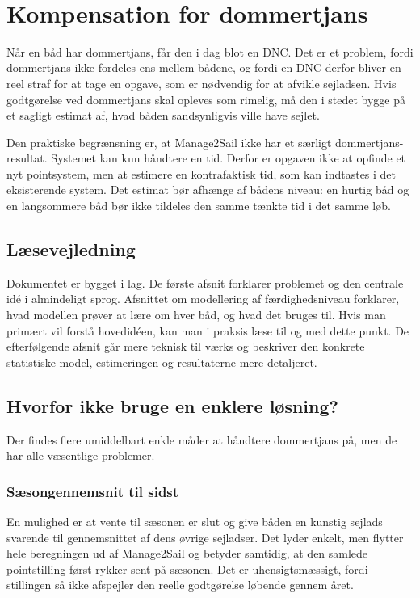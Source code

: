 \newpage
﻿\section{Kompensation for dommertjans}
Når en båd har dommertjans, får den i dag blot en DNC. Det er et problem, fordi dommertjans ikke fordeles ens mellem bådene, og fordi en DNC derfor bliver en reel straf for at tage en opgave, som er nødvendig for at afvikle sejladsen. Hvis godtgørelse ved dommertjans skal opleves som rimelig, må den i stedet bygge på et sagligt estimat af, hvad båden sandsynligvis ville have sejlet.

Den praktiske begrænsning er, at Manage2Sail ikke har et særligt dommertjans-resultat. Systemet kan kun håndtere en tid. Derfor er opgaven ikke at opfinde et nyt pointsystem, men at estimere en kontrafaktisk tid, som kan indtastes i det eksisterende system. Det estimat bør afhænge af bådens niveau: en hurtig båd og en langsommere båd bør ikke tildeles den samme tænkte tid i det samme løb.

\subsection*{Læsevejledning}
Dokumentet er bygget i lag. De første afsnit forklarer problemet og den centrale idé i almindeligt sprog. Afsnittet om modellering af færdighedsniveau forklarer, hvad modellen prøver at lære om hver båd, og hvad det bruges til. Hvis man primært vil forstå hovedidéen, kan man i praksis læse til og med dette punkt. De efterfølgende afsnit går mere teknisk til værks og beskriver den konkrete statistiske model, estimeringen og resultaterne mere detaljeret.

\subsection*{Hvorfor ikke bruge en enklere løsning?}
Der findes flere umiddelbart enkle måder at håndtere dommertjans på, men de har alle væsentlige problemer.

\subsubsection*{Sæsongennemsnit til sidst}
En mulighed er at vente til sæsonen er slut og give båden en kunstig sejlads svarende til gennemsnittet af dens øvrige sejladser. Det lyder enkelt, men flytter hele beregningen ud af Manage2Sail og betyder samtidig, at den samlede pointstilling først rykker sent på sæsonen. Det er uhensigtsmæssigt, fordi stillingen så ikke afspejler den reelle godtgørelse løbende gennem året.

